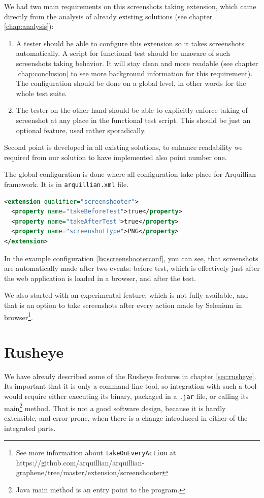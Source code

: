 \documentclass[11pt,oneside,final]{fithesis2}
\begin{document}
We had two main requirements on this screenshots taking extension, which came directly from the analysis of
already existing solutions (see chapter \ref{chap:analysis}):

\begin{enumerate}
 \item A tester should be able to configure this extension so it takes screenshots automatically. A script
 for functional test should be unaware of such screenshots taking behavior. It will stay clean and more 
 readable (see chapter \ref{chap:conclusion} to see more background information for this requirement).
 The configuration should be done on a global level, in other words for the whole test suite.
 \item The tester on the other hand should be able to explicitly enforce taking of screenshot at any place
 in the functional test script. This should be just an optional feature, used rather sporadically.
\end{enumerate}

Second point is developed in all existing solutions, to enhance readability we required from our solution
to have implemented also point number one.

The global configuration is done where all configuration take place for Arquillian framework. 
It is in \texttt{arquillian.xml} file.

\begin{lstlisting}[caption=Example of screenshooter configuration in arquillian.xml,label=lis:screenshooterconf,language=xml]
<extension qualifier="screenshooter">
  <property name="takeBeforeTest">true</property>
  <property name="takeAfterTest">true</property>
  <property name="screenshotType">PNG</property>
</extension>
\end{lstlisting}

In the example configuration \ref{lis:screenshooterconf}, you can see, that screenshots are automatically 
made after two events: before test, which is effectively just after the web application is loaded in 
a browser, and after the test. 

We also started with an experimental feature, which is not fully available, and that is an option
to take screenshots after every action made by Selenium in browser\footnote{See more information 
about \texttt{takeOnEveryAction} at https://github.com/arquillian/arquillian-graphene/tree/master/extension/screenshooter}.
  
\section{Rusheye}
We have already described some of the Rusheye features in chapter \ref{sec:rusheye}. Its important that it
is only a command line tool, so integration with such a tool would require either executing its binary,
packaged in a \texttt{.jar} file, or calling its main\footnote{Java main method is an entry point
to the program.} method. That is not a good software design, because it is hardly extensible, and error prone,
when there is a change introduced in either of the integrated parts.
\end{document}
